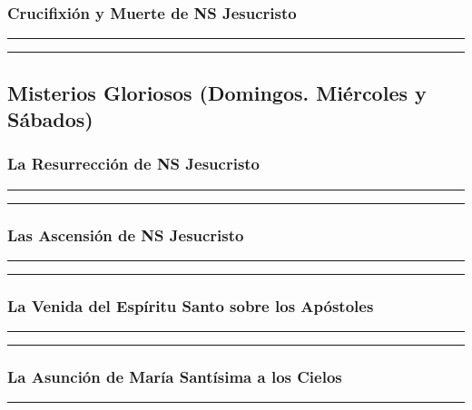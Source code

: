 \documentclass[11pt,a4paper]{report}
\begin{document}
    \subsubsection*{Crucifixión y Muerte de NS Jesucristo}
    
    
    \rule{\textwidth}{0.5pt}
    
    \rule{\textwidth}{0.5pt}
    

    \subsection*{Misterios Gloriosos (Domingos. Miércoles y Sábados)}

    
    \subsubsection*{La Resurrección de NS Jesucristo}
    
    \rule{\textwidth}{0.5pt}

    \rule{\textwidth}{0.5pt}
    

    \subsubsection*{Las Ascensión de NS Jesucristo}
    
    
    \rule{\textwidth}{0.5pt}

    \rule{\textwidth}{0.5pt}
    

    \subsubsection*{La Venida del Espíritu Santo sobre los Apóstoles}
    
    
    \rule{\textwidth}{0.5pt}

    \rule{\textwidth}{0.5pt}
    

    \subsubsection*{La Asunción de María Santísima a los Cielos}
    
    
    \rule{\textwidth}{0.5pt}
\end{document}
